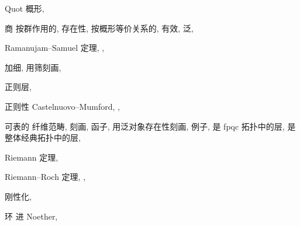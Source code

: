 \begin{theindex}
\item Quot 概形, 
\item 商
\subitem 按群作用的, 
\subsubitem 存在性, 
\subitem 按概形等价关系的, 
\subitem 有效, 
\subitem 泛, 
\indexspace
\item Ramanujam--Samuel 定理, , 
\item 加细, 
\subitem 用筛刻画, 
\item 正则层, 
\item 正则性
\subitem Castelnuovo--Mumford, , 
\item 可表的
\subitem 纤维范畴, 
\subsubitem 刻画, 
\subitem 函子, 
\subsubitem 用泛对象存在性刻画, 
\subsubitem 例子, 
\subsubitem 是 fpqc 拓扑中的层, 
\subsubitem 是整体经典拓扑中的层, 
\item Riemann 定理, 
\item Riemann--Roch 定理, , 
\item 刚性化, 
\item 环
\subitem 进 Noether, 


\end{theindex}
